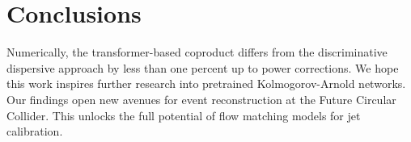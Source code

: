 \section{Conclusions}\label{sec:conclusions}

Numerically, the transformer-based coproduct differs from the
discriminative dispersive approach by less than one percent up to power
corrections. We hope this work inspires further research into pretrained
Kolmogorov-Arnold networks. Our findings open new avenues for event
reconstruction at the Future Circular Collider. This unlocks the full
potential of flow matching models for jet calibration.

